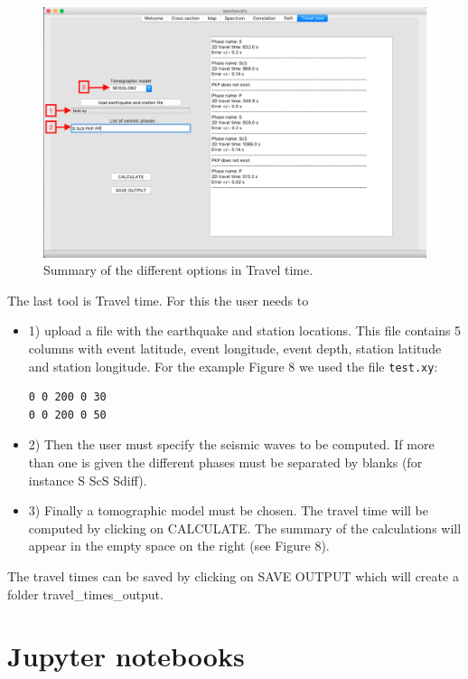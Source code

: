 \documentclass[12pt]{article}
\begin{document}
\begin{figure}
\begin{center}
\includegraphics[scale=0.35]{SeisTomoPy_notebook/figures/timepy.png}
\caption{Summary of the different options in Travel time.}
\label{timrpy}
\end{center}
\end{figure}


The last tool is Travel time. For this the user needs to
\begin{itemize}
\item 1) upload a file
with the earthquake and station locations. This file contains 5 columns
with event latitude, event longitude, event depth, station latitude and
station longitude.  For the example Figure 8 we used the file \verb|test.xy|:

\begin{verbatim}
0 0 200 0 30
0 0 200 0 50
\end{verbatim}

\item 2) Then the user must specify  the seismic waves to be
computed. If more than one is given the different phases must be separated by blanks (for instance S ScS Sdiff).
\item 3) Finally  a tomographic model must be chosen. The travel
time will be computed by clicking on CALCULATE. The summary of the
calculations will appear in the empty space on the right (see Figure 8).
\end{itemize}

The travel times can be saved by clicking on SAVE OUTPUT which will
create a folder travel\_times\_output.




\section{Jupyter notebooks}\label{notebooks}
\end{document}
